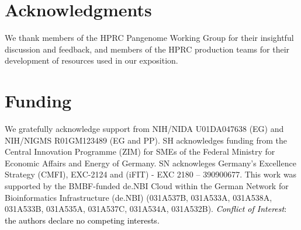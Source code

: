 \documentclass{bioinfo}
\newcommand{\REVIEWED}[1]{{\textcolor{Black}{#1}}}
\begin{document}









\section*{Acknowledgments}

We thank members of the HPRC Pangenome Working Group for their insightful discussion and feedback, and members of the HPRC production teams for their development of resources used in our exposition.

\section*{Funding}

We gratefully acknowledge support from NIH/NIDA U01DA047638 (EG) and NIH/NIGMS R01GM123489 (EG and PP).
SH acknowledges funding from the Central Innovation Programme (ZIM) for SMEs of the Federal Ministry for Economic Affairs and Energy of Germany. SN acknowleges Germany’s Excellence Strategy (CMFI), EXC-2124 and (iFIT) - EXC 2180 – 390900677.
This work was supported by the BMBF-funded de.NBI Cloud within the German Network for Bioinformatics Infrastructure (de.NBI) (031A537B, 031A533A, 031A538A, 031A533B, 031A535A, 031A537C, 031A534A, 031A532B).
\linebreak
\linebreak
\REVIEWED{\textit{Conflict of Interest}: the authors declare no competing interests.}
\end{document}
